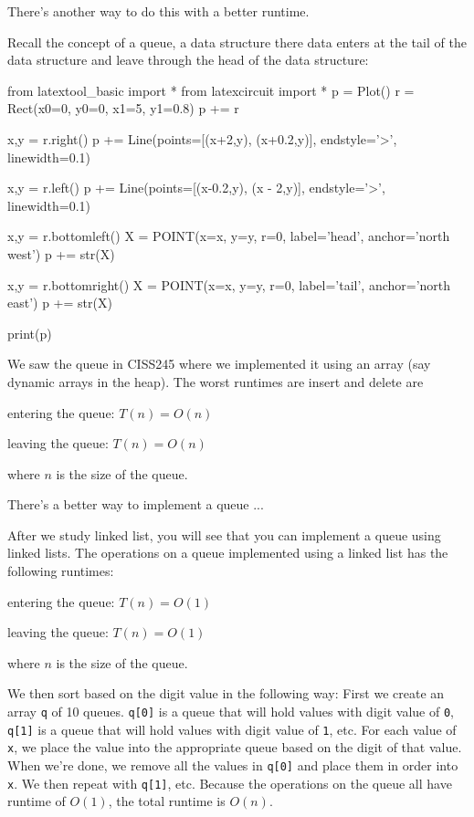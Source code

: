 There's another way to do this with a better runtime.

Recall the concept of a queue, a data structure there data enters at
the tail of the data structure and leave through the head of the data structure:

\begin{python}
from latextool_basic import *
from latexcircuit import *
p = Plot()
r = Rect(x0=0, y0=0, x1=5, y1=0.8)
p += r

x,y = r.right()
p += Line(points=[(x+2,y), (x+0.2,y)], endstyle='>', linewidth=0.1)

x,y = r.left()
p += Line(points=[(x-0.2,y), (x - 2,y)], endstyle='>', linewidth=0.1)

x,y = r.bottomleft()
X = POINT(x=x, y=y, r=0, label='head', anchor='north west')
p += str(X)

x,y = r.bottomright()
X = POINT(x=x, y=y, r=0, label='tail', anchor='north east')
p += str(X)

print(p)
\end{python}

We saw the queue in CISS245 where we implemented it using an array
(say dynamic arrays in the heap).
The worst runtimes are insert and delete are
\begin{tightlist}
\item entering the queue: $T(n) = O(n)$  
\item leaving the queue: $T(n) = O(n)$ 
\end{tightlist}
where $n$ is the size of the queue.

There's a better way to implement a queue ...

After we study linked list, you will see that you can implement a queue using
linked lists.
The operations 
on a queue implemented using a linked list has the following runtimes:
\begin{tightlist}
\item entering the queue: $T(n) = O(1)$ 
\item leaving the queue: $T(n) = O(1)$ 
\end{tightlist}
where $n$ is the size of the queue.

We then sort based on the digit value in the following way:
First we create an array \verb!q! of 10 queues.
\verb!q[0]! is a queue that will hold values with digit value of \verb!0!,
\verb!q[1]! is a queue that will hold values with digit value of \verb!1!, etc.
For each value of \verb!x!, we place the value into the appropriate queue
based on the digit of that value.
When we're done, we remove all the values in \verb!q[0]! and place them
in order into \verb!x!.
We then repeat with \verb!q[1]!, etc.
Because the operations on the queue all have runtime of $O(1)$,
the total runtime is $O(n)$.

